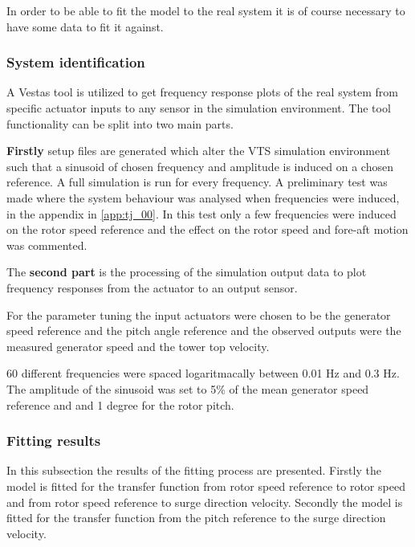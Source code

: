 \medskip
In order to be able to fit the model to the real system it is of course necessary to have some data to fit it against.

\subsubsection{System identification}
A Vestas tool is utilized to get frequency response plots of the real system from specific actuator inputs to any sensor in the simulation environment. The tool functionality can be split into two main parts. 

\textbf{Firstly} setup files are generated which alter the VTS simulation environment such that a sinusoid of chosen frequency and amplitude is induced on a chosen reference. A full simulation is run for every frequency. A preliminary test was made where the system behaviour was analysed when frequencies were induced, in the appendix in \cref{app:tj_00}. In this test only a few frequencies were induced on the rotor speed reference and the effect on the rotor speed and fore-aft motion was commented.

The \textbf{second part} is the processing of the simulation output data to plot frequency responses from the actuator to an output sensor. 

For the parameter tuning the input actuators were chosen to be the generator speed reference and the pitch angle reference and the observed outputs were the measured generator speed and the tower top velocity.

60 different frequencies were spaced logaritmacally between 0.01 Hz and 0.3 Hz. The amplitude of the sinusoid was set to 5\% of the mean generator speed reference and and 1 degree for the rotor pitch. 

\subsubsection{Fitting results}
In this subsection the results of the fitting process are presented. Firstly the model is fitted for the transfer function from rotor speed reference to rotor speed and from rotor speed reference to surge direction velocity. Secondly the model is fitted for the transfer function from the pitch reference to the surge direction velocity.

